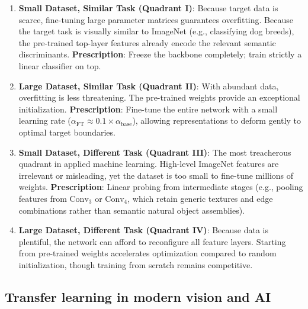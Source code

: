 \begin{enumerate}[leftmargin=*]
  \item \textbf{Small Dataset, Similar Task (Quadrant I)}:
    Because target data is scarce, fine-tuning large parameter matrices guarantees overfitting. Because the target task is visually similar to ImageNet (e.g., classifying dog breeds), the pre-trained top-layer features already encode the relevant semantic discriminants. \textbf{Prescription}: Freeze the backbone completely; train strictly a linear classifier on top.
  \item \textbf{Large Dataset, Similar Task (Quadrant II)}:
    With abundant data, overfitting is less threatening. The pre-trained weights provide an exceptional initialization. \textbf{Prescription}: Fine-tune the entire network with a small learning rate ($\alpha_{\text{FT}} \approx 0.1 \times \alpha_{\text{base}}$), allowing representations to deform gently to optimal target boundaries.
  \item \textbf{Small Dataset, Different Task (Quadrant III)}:
    The most treacherous quadrant in applied machine learning. High-level ImageNet features are irrelevant or misleading, yet the dataset is too small to fine-tune millions of weights. \textbf{Prescription}: Linear probing from intermediate stages (e.g., pooling features from $\text{Conv}_3$ or $\text{Conv}_4$, which retain generic textures and edge combinations rather than semantic natural object assemblies).
  \item \textbf{Large Dataset, Different Task (Quadrant IV)}:
    Because data is plentiful, the network can afford to reconfigure all feature layers. Starting from pre-trained weights accelerates optimization compared to random initialization, though training from scratch remains competitive.
\end{enumerate}

\subsection{Transfer learning in modern vision and AI}
\label{sec:pervasiveness_transfer_learning}

